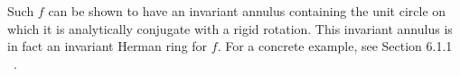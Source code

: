 \documentclass[12pt]{article}
\newtheorem{theorem}{Theorem}[section]
\newtheorem{definition}{Definition}[section]
\begin{document}
%	
Such $f$ can be shown to have an invariant annulus containing the unit circle on which it is analytically conjugate with a rigid rotation. This invariant annulus is in fact an invariant Herman ring for $f$. For a concrete example, see Section 6.1.1 ~\cite{branner2014quasiconformal}.  
\end{document}
